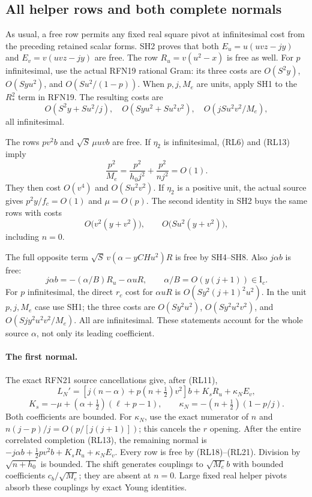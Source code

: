 \subsection{All helper rows and both complete normals}

As usual, a free row permits any fixed real square pivot at
infinitesimal cost from the preceding retained scalar forms.
SH2 proves that both \(E_u=u(uvz-jy)\) and \(E_v=v(uvz-jy)\)
are free.  The row \(R_u=v(u^2-x)\) is free as well.
For \(p\) infinitesimal, use the actual RFN19 rational Gram:
its three costs are \(O(S^2y)\), \(O(Syu^2)\),
and \(O(Su^2/(1-p))\).
When \(p,j,M_e\) are units, apply SH1 to the \(R_*^2\)
term in RFN19.  The resulting costs are
\[
 O(S^2y+Su^2/j),\quad O(Syu^2+Su^2v^2),\quad
 O(jSu^2v^2/M_e),                                    \tag{RL18}
\]
all infinitesimal.

The rows \(pv^2b\) and \(\sqrt S\,\mu uvb\) are free.
If \(\eta_2\) is infinitesimal, (RL6) and (RL13) imply
\[
 \frac{p^2}{M_e}
  =\frac{p^2}{h_0j^2}+\frac{p^2}{nj^2}=O(1).
                                                               \tag{RL19}
\]
They then cost \(O(v^4)\) and \(O(Su^2v^2)\).
If \(\eta_2\) is a positive unit, the actual source gives
\(p^2y/f_c=O(1)\) and \(\mu=O(p)\).
The second identity in SH2 buys the same rows with costs
\[
 O\bigl(v^2(y+v^2)\bigr),\qquad
 O\bigl(Su^2(y+v^2)\bigr),                             \tag{RL20}
\]
including \(n=0\).

The full opposite term \(\sqrt S\,v(\alpha-yCHu^2)R\)
is free by SH4--SH8.  Also \(j\alpha b\) is free:
\[
 j\alpha b=-(\alpha/B)R_u-\alpha uR,\qquad
 \alpha/B=O(y(j+1))\in\mathrm I_c.
                                                               \tag{RL21}
\]
For \(p\) infinitesimal, the direct \(r_c\) cost for
\(\alpha uR\) is \(O(Sy^2(j+1)^2u^2)\).
In the unit \(p,j,M_e\) case use SH1; the three costs
are \(O(Sy^2u^2)\), \(O(Sy^2u^2v^2)\), and
\(O(Sjy^2u^2v^2/M_e)\).  All are infinitesimal.
These statements account for the whole source \(\alpha\), not
only its leading coefficient.

\paragraph{The first normal.}
The exact RFN21 source cancellations give, after (RL11),
\[
 L_N'=[j(n-\alpha)+p(n+\tfrac12)v^2]b
             +K_sR_u+\kappa_NE_v,                     \tag{RL22}
\]
\[
 K_s=-\mu+(\alpha+\tfrac12)(\ell+p-1),\qquad
 \kappa_N=-(n+\tfrac12)(1-p/j).
\]
Both coefficients are bounded.  For \(\kappa_N\), use the
exact numerator of \(n\) and
\(n(j-p)/j=O(p/[j(j+1)])\); this cancels the \(r\) opening.
After the entire correlated completion (RL13), the remaining
normal is
\(-j\alpha b+\tfrac12pv^2b+K_sR_u+\kappa_NE_v\).
Every row is free by (RL18)--(RL21).
Division by \(\sqrt{n+h_0}\) is bounded.
The shift generates couplings to \(\sqrt{M_e}b\) with bounded
coefficients \(c_b/\sqrt{M_e}\); they are absent at \(n=0\).
Large fixed real helper pivots absorb these couplings by exact
Young identities.

